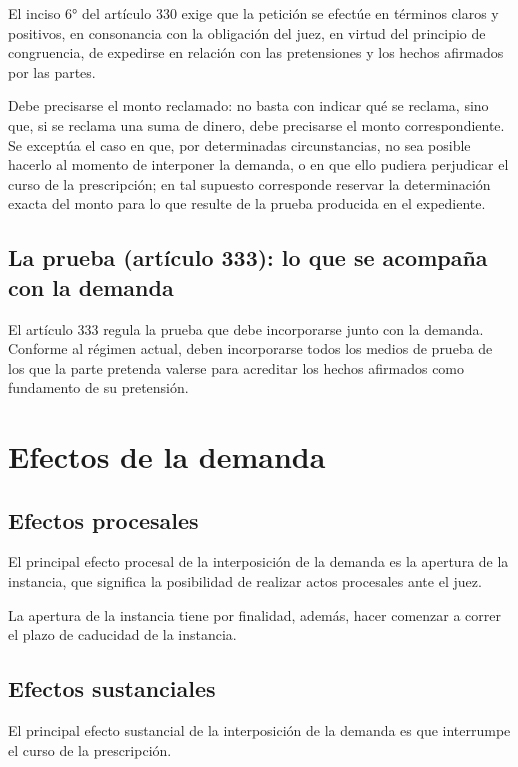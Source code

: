 \documentclass[12pt,oneside]{book}
\begin{document}
El inciso 6° del artículo 330 exige que la petición se efectúe en términos claros y positivos, en consonancia con la obligación del juez, en virtud del principio de congruencia, de expedirse en relación con las pretensiones y los hechos afirmados por las partes.

Debe precisarse el monto reclamado: no basta con indicar qué se reclama, sino que, si se reclama una suma de dinero, debe precisarse el monto correspondiente. Se exceptúa el caso en que, por determinadas circunstancias, no sea posible hacerlo al momento de interponer la demanda, o en que ello pudiera perjudicar el curso de la prescripción; en tal supuesto corresponde reservar la determinación exacta del monto para lo que resulte de la prueba producida en el expediente.

\section{La prueba (artículo 333): lo que se acompaña con la demanda}

El artículo 333 regula la prueba que debe incorporarse junto con la demanda. Conforme al régimen actual, deben incorporarse todos los medios de prueba de los que la parte pretenda valerse para acreditar los hechos afirmados como fundamento de su pretensión.

\chapter{Efectos de la demanda}

\section{Efectos procesales}

El principal efecto procesal de la interposición de la demanda es la apertura de la instancia, que significa la posibilidad de realizar actos procesales ante el juez.

\begin{important}
La apertura de la instancia tiene por finalidad, además, hacer comenzar a correr el plazo de caducidad de la instancia.
\end{important}

\section{Efectos sustanciales}

El principal efecto sustancial de la interposición de la demanda es que interrumpe el curso de la prescripción.
\end{document}
